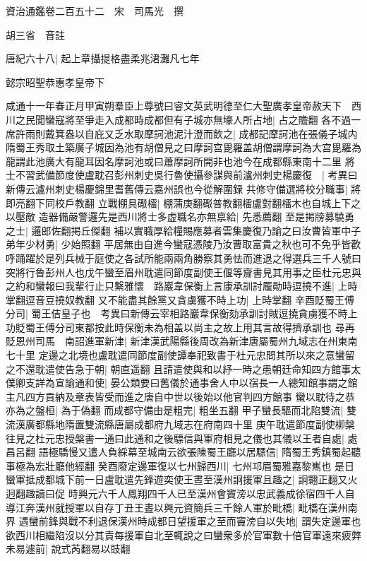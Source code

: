 資治通鑑卷二百五十二　宋　司馬光　撰

胡三省　音註

唐紀六十八|{
	起上章攝提格盡柔兆涒灘凡七年}


懿宗昭聖恭惠孝皇帝下

咸通十一年春正月甲寅朔羣臣上尊號曰睿文英武明德至仁大聖廣孝皇帝赦天下　西川之民聞蠻寇將至爭走入成都時成都但有子城亦無壕人所占地|{
	占之贍翻}
各不過一席許雨則戴箕盎以自庇又乏水取摩訶池泥汁澄而飲之|{
	成都記摩訶池在張儀子城内隋蜀王秀取土築廣子城因為池有胡僧見之曰摩訶宫毘羅盖胡僧謂摩訶為大宫毘羅為龍謂此池廣大有龍耳因名摩訶池或曰蕭摩訶所開非也池今在成都縣東南十二里}
將士不習武備節度使盧耽召彭州刺史吳行魯使攝參謀與前瀘州刺史楊慶復　|{
	考異曰新傳云瀘州刺史楊慶錦里耆舊傳云嘉州誤也今從解圍録}
共修守備選將校分職事|{
	將即亮翻下同校戶教翻}
立戰棚具礟檑|{
	棚蒲庚翻礟普教翻檑盧對翻檑木也自城上下之以壓敵}
造器備嚴警邏先是西川將士多虚職名亦無禀給|{
	先悉薦翻}
至是掲牓募驍勇之士|{
	邏郎佐翻掲丘傑翻}
補以實職厚給糧賜應募者雲集慶復乃諭之曰汝曹皆軍中子弟年少材勇|{
	少始照翻}
平居無由自進今蠻寇憑陵乃汝曹取富貴之秋也可不免乎皆歡呼踊躍於是列兵械于庭使之各試所能兩兩角勝察其勇怯而進退之得選兵三千人號曰突將行魯彭州人也戊午蠻至眉州耽遣同節度副使王偃等齎書見其用事之臣杜元忠與之約和蠻報曰我輩行止只繫雅懷　路巖韋保衡上言康承訓討龎勛時逗撓不進|{
	上時掌翻逗音豆撓奴教翻}
又不能盡其餘黨又貪虜獲不時上功|{
	上時掌翻}
辛酉貶蜀王傅分司|{
	蜀王佶皇子也　考異曰新傳云宰相路巖韋保衡劾承訓討賊逗撓貪虜獲不時上功貶蜀王傅分司東都按此時保衡未為相盖以尚主之故上用其言故得擠承訓也}
尋再貶恩州司馬　南詔進軍新津|{
	新津漢武陽縣後周改為新津唐屬蜀州九域志在州東南七十里}
定邊之北境也盧耽遣同節度副使譚奉祀致書于杜元忠問其所以來之意蠻留之不還耽遣使告急于朝|{
	朝直遥翻}
且請遣使與和以紓一時之患朝廷命知四方館事太僕卿支詳為宣諭通和使|{
	晏公類要曰舊儀於通事舍人中以宿長一人總知館事謂之館主凡四方貢納及章表皆受而進之唐自中世以後始以他官判四方館事}
蠻以耽待之恭亦為之盤桓|{
	為于偽翻}
而成都守備由是粗完|{
	粗坐五翻}
甲子蠻長驅而北陷雙流|{
	雙流漢廣都縣地隋置雙流縣唐屬成都府九域志在府南四十里}
庚午耽遣節度副使柳槃往見之杜元忠授槃書一通曰此通和之後驃信與軍府相見之儀也其儀以王者自處|{
	處昌呂翻}
語極驕慢又遣人負綵幕至城南云欲張陳蜀王廳以居驃信|{
	隋蜀王秀鎮蜀起聽事極為宏壯廳他經翻}
癸酉廢定邊軍復以七州歸西川|{
	七州邛眉蜀雅嘉黎嶲也}
是日蠻軍抵成都城下前一日盧耽遣先鋒遊奕使王晝至漢州詗援軍且趣之|{
	詗翾正翻又火迥翻趣讀曰促}
時興元六千人鳳翔四千人已至漢州會竇滂以忠武義成徐宿四千人自導江奔漢州就授軍以自存丁丑王晝以興元資簡兵三千餘人軍於毗橋|{
	毗橋在漢州南界}
遇蠻前鋒與戰不利退保漢州時成都日望援軍之至而竇滂自以失地|{
	謂失定邊軍也}
欲西川相繼陷沒以分其責每援軍自北至輒說之曰蠻衆多於官軍數十倍官軍遠來疲弊未易遽前|{
	說式芮翻易以豉翻}
